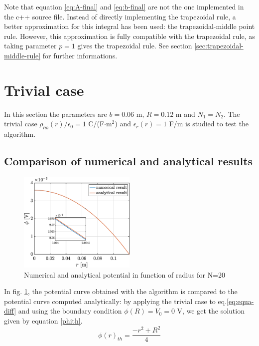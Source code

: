 \documentclass[a4paper,12pt,twoside]{article}
\begin{document}
  Note that equation \eqref{eq:A-final} and \eqref{eq:b-final} are not the one implemented in the c++ source file.
  Instead of directly implementing the trapezoidal rule, a better approximation for this integral has been used: the trapezoidal-middle point rule.
  However, this approximation is fully compatible with the trapezoidal rule, as taking parameter $p=1$ gives the trapezoidal rule.
  See section \ref{sec:trapezoidal-middle-rule} for further informations. %

  \section{Trivial case}
  \label{sec1}

  In this section the parameters are $b=0.06$ m, $R=0.12$ m and $N_1=N_2$. The trivial case $\rho_{lib}(r)/\epsilon_0=1$ C/(F$\cdot$m$^2$) and $\epsilon_r(r)=1$ F/m is studied to test the algorithm.

  \subsection{Comparison of numerical and analytical results}

  \begin{figure}[h!]
   \centering
   \includegraphics[width=0.5\textwidth]{graphs/c_phi.eps}
   \caption{Numerical and analytical potential in function of radius for N=20}
   \label{cphi}
  \end{figure}

  In fig. \ref{cphi}, the potential curve obtained with the algorithm is compared to the potential curve computed analytically: by applying the trivial case to eq.\eqref{eq:equa-diff} and using the boundary condition $\phi(R)=V_0=0$ V, we get the solution given by equation \eqref{phith}.
  \begin{equation}
   \phi(r)_{th} = \frac{-r^2+R^2}{4}
   \label{phith}
  \end{equation}
\end{document}
